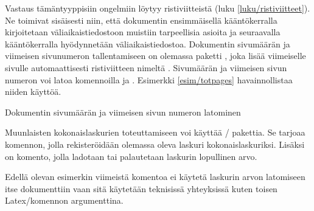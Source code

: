 Vastaus tämäntyyppisiin ongelmiin löytyy ristiviitteistä (luku
\ref{luku/ristiviitteet}). Ne toimivat sisäisesti niin, että dokumentin
ensimmäisellä kääntökerralla kirjoitetaan väliaikaistiedostoon muistiin
tarpeellisia asioita ja seuraavalla kääntökerralla hyödynnetään
väliaikaistiedostoa. Dokumentin sivumäärän ja viimeisen sivunumeron
tallentamiseen on olemassa paketti
, joka lisää viimeiselle sivulle
automaattisesti ristiviitteen nimeltä . Sivumäärän ja
viimeisen sivun numeron voi latoa komennoilla  ja
. Esimerkki \ref{esim/totpages} havainnollistaa niiden
käyttöä.

\begin{esimerkki*}

  \caption{Dokumentin sivumäärän ja viimeisen sivun numeron latominen}
  \label{esim/totpages}
\end{esimerkki*}

Muunlaisten kokonaislaskurien toteuttamiseen voi käyttää
\-/ pakettia. Se tarjoaa komennon,
jolla rekisteröidään olemassa oleva laskuri kokonaislaskuriksi. Lisäksi
on komento, jolla ladotaan tai palautetaan laskurin lopullinen arvo.

\begin{koodilohkosis}
\addtocounter{oma}{1} %
\end{koodilohkosis}

\noindent
Edellä olevan esimerkin viimeistä komentoa  ei käytetä
laskurin arvon latomiseen itse dokumenttiin vaan sitä käytetään
teknisissä yhteyksissä kuten toisen Latex\-/komennon argumenttina.

